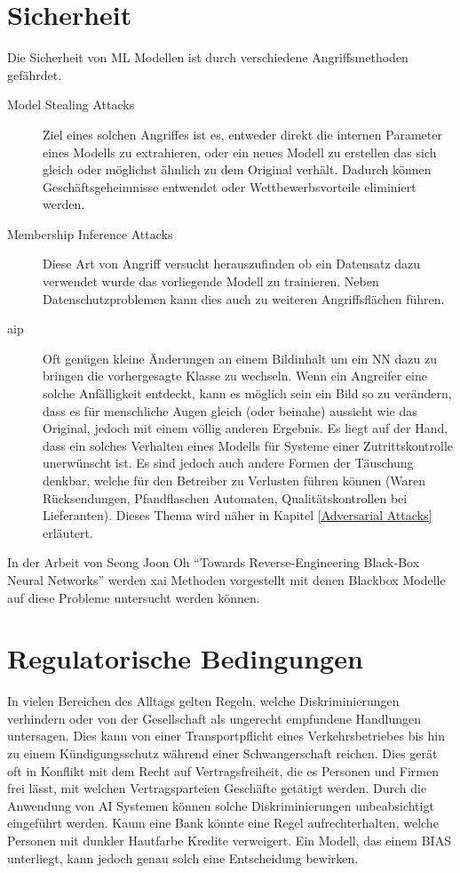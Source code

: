 \documentclass[
  12pt, %
  a4paper, %
  oneside, %
  openany, 
  numbers=noenddot, %
  BCOR=5mm, %
  parskip=half*, %
  thesis, %
]{bfhbook}
\begin{document}
\section{Sicherheit}
\label{Sicherheit}
Die Sicherheit von \Gls{ML} Modellen ist durch verschiedene Angriffsmethoden gefährdet.
\begin{description}
	\item[Model Stealing Attacks] Ziel eines solchen Angriffes ist es, entweder direkt die internen Parameter eines Modells zu extrahieren, oder ein neues Modell zu erstellen das sich gleich oder möglichst ähnlich zu dem Original verhält. Dadurch können Geschäftsgeheimnisse entwendet oder Wettbewerbsvorteile eliminiert werden.
	\item[Membership Inference Attacks] Diese Art von Angriff versucht herauszufinden ob ein Datensatz dazu verwendet wurde das vorliegende Modell zu trainieren. Neben Datenschutzproblemen kann dies auch zu weiteren Angriffsflächen führen.
	\item[\acrfull{aip}] Oft genügen kleine Änderungen an einem Bildinhalt um ein \gls{NN} dazu zu bringen die vorhergesagte Klasse zu wechseln. Wenn ein Angreifer eine solche Anfälligkeit entdeckt, kann es möglich sein ein Bild so zu verändern, dass es für menschliche Augen gleich (oder beinahe) aussieht wie das Original, jedoch mit einem völlig anderen Ergebnis. Es liegt auf der Hand, dass ein solches Verhalten eines Modells für Systeme einer Zutrittskontrolle unerwünscht ist. Es sind jedoch auch andere Formen der Täuschung denkbar, welche für den Betreiber zu Verlusten führen können (Waren Rücksendungen, Pfandflaschen Automaten, Qualitätskontrollen bei Lieferanten). Dieses Thema wird näher in Kapitel \ref{Adversarial Attacks} erläutert.
\end{description}

In der Arbeit von Seong Joon Oh ``Towards Reverse-Engineering Black-Box Neural Networks'' \parencite{Oh2019} werden \Gls{xai} Methoden vorgestellt mit denen \Gls{Blackbox} Modelle auf diese Probleme untersucht werden können.

\section{Regulatorische Bedingungen}
In vielen Bereichen des Alltags gelten Regeln, welche Diskriminierungen verhindern oder von der Gesellschaft als ungerecht empfundene Handlungen untersagen. Dies kann von einer Transportpflicht eines Verkehrsbetriebes bis hin zu einem Kündigungsschutz während einer Schwangerschaft reichen. Dies gerät oft in Konflikt mit dem Recht auf Vertragsfreiheit, die es Personen und Firmen frei lässt, mit welchen Vertragsparteien Geschäfte getätigt werden.
Durch die Anwendung von \Gls{AI} Systemen können solche Diskriminierungen unbeabsichtigt eingeführt werden. Kaum eine Bank könnte eine Regel aufrechterhalten, welche Personen mit dunkler Hautfarbe Kredite verweigert. Ein Modell, das einem \Gls{BIAS} unterliegt, kann jedoch genau solch eine Entscheidung bewirken.
\end{document}

